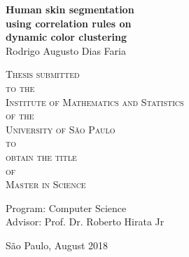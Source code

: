 \documentclass[12pt,twoside,a4paper]{book}
\theoremstyle{plain}
\theoremstyle{definition}
\begin{document}
\frontmatter 
\fancyhead[RO]{{\footnotesize\rightmark}\hspace{2em}\thepage}
\setcounter{tocdepth}{2}
\fancyhead[LE]{\thepage\hspace{2em}\footnotesize{\leftmark}}
\fancyhead[RE,LO]{}
\fancyhead[RO]{{\footnotesize\rightmark}\hspace{2em}\thepage}

\onehalfspacing  %

\thispagestyle{empty}
\begin{center}
    \vspace*{2.3cm}
    \textbf{\Large{Human skin segmentation\\[-0.25cm]
    using correlation rules on\\
    dynamic color clustering}}\\
    
    \vspace*{1.2cm}
    \Large{Rodrigo Augusto Dias Faria}
    
    \vskip 2cm
    \textsc{
    Thesis submitted\\[-0.25cm]
    to the\\[-0.25cm]
    Institute of Mathematics and Statistics\\[-0.25cm]
    of the\\[-0.25cm]
    University of São Paulo\\[-0.25cm]
    to\\[-0.25cm]
    obtain the title\\[-0.25cm]
    of\\[-0.25cm]
    Master in Science}
    
    \vskip 1.5cm
    Program: Computer Science\\
    Advisor: Prof. Dr. Roberto Hirata Jr

    
    \vskip 1.5cm %
    \normalsize{São Paulo, August 2018}
\end{center}
\end{document}
